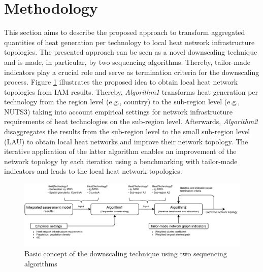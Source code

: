 \section{Methodology}
This section aims to describe the proposed approach to transform aggregated quantities of heat generation per technology to local heat network infrastructure topologies. The presented approach can be seen as a novel downscaling technique and is made, in particular, by two sequencing algorithms. Thereby, tailor-made indicators play a crucial role and serve as termination criteria for the downscaling process. Figure \ref{fig:meth1} illustrates the proposed idea to obtain local heat network topologies from IAM results. Thereby, \textit{Algorithm1} transforms heat generation per technology from the region level (e.g., country) to the sub-region level (e.g., NUTS3) taking into account empirical settings for network infrastructure requirements of heat technologies on the sub-region level. Afterwards, \textit{Algorithm2} disaggregates the results from the sub-region level to the small sub-region level (LAU) to obtain local heat networks and improve their network topology. The iterative application of the latter algorithm enables an improvement of the network topology by each iteration using a benchmarking with tailor-made indicators and leads to the local heat network topologies.\vspace{0.3cm}

\begin{figure}[h]
	\centering
	\includegraphics[width=1\linewidth]{figures/3_Methodology/Flow_diagram.pdf}
	\caption{Basic concept of the downscaling technique using two sequencing algorithms}
	\label{fig:meth1}
\end{figure}

